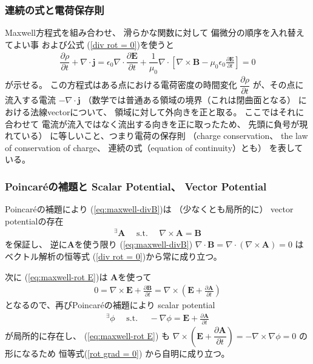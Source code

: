\subsubsection{連続の式と電荷保存則}

Maxwell方程式を組み合わせ、
滑らかな関数に対して
偏微分の順序を入れ替えてよい事
および公式
(\ref{div rot = 0})を使うと
\begin{align}
  \dfrac{\partial \rho}{\partial t}
+
  \nabla \cdot \bm{j}
=
  \epsilon_0
  \nabla \cdot
  \dfrac{\partial \bm{E}}{\partial t}
+
  \dfrac{1}{\mu_0}
  \nabla \cdot
  \left[
    \nabla \times \bm{B}
  -
    \mu_0 \epsilon_0
    \frac{\partial \bm{E}}
      {\partial t}
  \right]
= 0
\label{electric charge conservation}
\end{align}
が示せる。
この方程式はある点における電荷密度の時間変化
$\dfrac{\partial \rho}{\partial t}$
が、その点に流入する電流
$- \nabla \cdot \bm{j}$
（数学では普通ある領域の境界（これは閉曲面となる）
における法線vectorについて、
領域に対して外向きを正と取る。
ここではそれに合わせて
電流が流入ではなく流出する向きを正に取ったため、
先頭に負号が現れている）
に等しいこと、つまり電荷の保存則
（charge conservation、
the law of conservation of charge、
連続の式（equation of continuity）とも）
を表している。

\subsubsection{Poincar\'eの補題と
  Scalar Potential、
  Vector Potential}

Poincar\'eの補題により
(\ref{eq:maxwell-divB})は
（少なくとも局所的に）
vector potentialの存在
\begin{align}
  {}^\exists
  \bm{A}
\quad
\text{ s.t. }
\quad
  \nabla \times \bm{A}
=
  \bm{B}
\end{align}
を保証し、
逆に$\bm{A}$を使う限り
(\ref{eq:maxwell-divB})
$\nabla \cdot \bm{B}
= \nabla \cdot
(\nabla \times \bm{A})
= 0$
はベクトル解析の恒等式
(\ref{div rot = 0})から常に成り立つ。

次に
(\ref{eq:maxwell-rot E})は
$\bm{A}$を使って
\begin{align}
  0 =
  \nabla \times \bm{E}
  +
  \frac{\partial \bm{B}}
    {\partial t}
=
  \nabla \times
  \left(
    \bm{E}
    +
    \frac{\partial \bm{A}}
      {\partial t}      
  \right)
\end{align}
となるので、再びPoincar\'eの補題により
scalar potential
\begin{align}
  {}^\exists \phi
\quad
\text{ s.t. }
\quad
  - \nabla \phi
=
  \bm{E}
  +
  \frac{\partial \bm{A}}
    {\partial t}
\end{align}
が局所的に存在し、
(\ref{eq:maxwell-rot E})
も
$\nabla \times
\left(
  \bm{E} +
  \dfrac{\partial \bm{A}}
    {\partial t}
\right)
= - \nabla \times \nabla \phi
= 0$
の形になるため
恒等式(\ref{rot grad = 0})
から自明に成り立つ。


